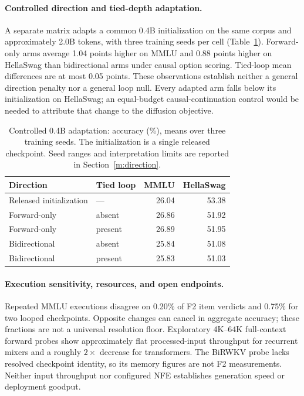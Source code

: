 \documentclass{article}
\theoremstyle{remark}\newtheorem{remark}[theorem]{Remark}
\begin{document}
\paragraph{Controlled direction and tied-depth adaptation.}
A separate matrix adapts a common 0.4B initialization on the same corpus and approximately
2.0B tokens, with three training seeds per cell (Table~\ref{tab:main-direction}).
Forward-only arms average 1.04 points higher on MMLU and 0.88 points higher on HellaSwag
than bidirectional arms under causal option scoring. Tied-loop mean differences are
at most 0.05 points. These observations establish neither a general direction penalty
nor a general loop null. Every adapted arm falls below its initialization on HellaSwag;
an equal-budget causal-continuation control would be needed to attribute that change
to the diffusion objective.

\begin{table}[t]
\centering\small
\begin{tabular}{@{}llrr@{}}
\toprule
Direction & Tied loop & MMLU & HellaSwag\\
\midrule
Released initialization & --- & 26.04 & 53.38\\
Forward-only & absent & 26.86 & 51.92\\
Forward-only & present & 26.89 & 51.95\\
Bidirectional & absent & 25.84 & 51.08\\
Bidirectional & present & 25.83 & 51.03\\
\bottomrule
\end{tabular}
\caption{Controlled 0.4B adaptation: accuracy (\%), means over three training seeds.
The initialization is a single released checkpoint. Seed ranges and interpretation
limits are reported in Section~\ref{m:direction}.}
\label{tab:main-direction}
\end{table}

\paragraph{Execution sensitivity, resources, and open endpoints.}
Repeated MMLU executions disagree on 0.20\% of F2 item verdicts and 0.75\% for two
looped checkpoints. Opposite changes can cancel in aggregate accuracy; these fractions
are not a universal resolution floor. Exploratory 4K--64K full-context forward probes
show approximately flat processed-input throughput for recurrent mixers and a roughly
$2\times$ decrease for transformers. The BiRWKV probe lacks resolved checkpoint
identity, so its memory figures are not F2 measurements. Neither input throughput nor
configured NFE establishes generation speed or deployment goodput.
\end{document}
